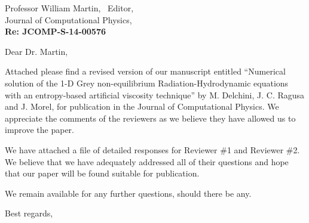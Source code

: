 
        \addtolength{\topmargin}{-2.5cm}    %
       \addtolength{\textheight}{5cm}    %

\address{Dr. Jean Ragusa \\
Nuclear Engineering Dept.\\
Texas A\&M University\\
College Station, TX
 \vspace{0.5cm}}


\signature{Marc Delchini, Jean Ragusa, and Jim Morel}




\begin{letter}{Professor William Martin, \  Editor,\\
    Journal of Computational Physics,\\
\textbf{Re: JCOMP-S-14-00576}}


\date{\today}

\opening{Dear Dr. Martin,}
         \vspace{0.25cm}

Attached please find a revised version of our manuscript entitled
``Numerical solution of the 1-D Grey non-equilibrium Radiation-Hydrodynamic equations with an entropy-based artificial viscosity technique''
by M. Delchini, J. C. Ragusa and J. Morel, for
publication in the Journal of Computational Physics. We appreciate the comments of the reviewers as we
believe they have allowed us to improve the paper.

We have attached a file of detailed responses for Reviewer \#1 and Reviewer \#2.
We believe that we have adequately addressed all of their questions and hope that our paper will be found suitable for publication.

%
%
\bigskip

We remain available for any further questions, should there be any.
\vspace{0.25cm}



\closing{Best regards, }

\end{letter}



